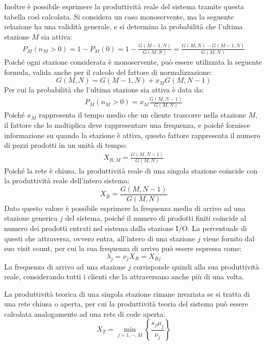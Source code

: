 \documentclass{article}
\numberwithin{equation}{subsection}
\begin{document}
Inoltre è possibile esprimere la produttività reale del sistema tramite questa tabella così calcolata. Si considera un caso monoservente, ma la seguente relazione ha una 
validità generale, e si determina la probabilità che l'ultima stazione $M$ sia attiva:
\begin{gather*}
    P_M(n_M>0)=1-P_M(0)=1-\displaystyle\frac{G(M-1,N)}{G(M,N)}=\frac{G(M,N)-G(M-1,N)}{G(M,N)}
\end{gather*}
Poiché ogni stazione considerata è monoservente, può essere utilizzata la seguente formula, valida anche per il calcolo 
del fattore di normalizzazione:
\begin{equation}
    G(M,N)=G(M-1,N)+x_MG(M,N-1)
\end{equation}
Per cui la probabilità che l'ultima stazione sia attiva è data da:
\begin{gather*}
    P_M(n_M>0)=\displaystyle x_M\frac{G(M,N-1)}{G(M,N)}
\end{gather*}
Poiché $x_M$ rappresenta il tempo medio che un cliente trascorre nella stazione $M$, il fattore che lo moltiplica deve rappresentare una frequenza, e poiché fornisce 
informazione su quando la stazione è attiva, questo fattore rappresenta il numero di pezzi prodotti in un unità di tempo:
\begin{gather*}
    X_{R,M}=\displaystyle\frac{G(M,N-1)}{G(M,N)}
\end{gather*}
Poiché la rete è chiusa, la produttività reale di una singola stazione coincide con la produttività reale dell'intero sistema:
\begin{equation}
    X_R=\displaystyle\frac{G(M,N-1)}{G(M,N)}
\end{equation}
Dato questo valore è possibile esprimere la frequenza media di arrivo ad una stazione generica $j$ del sistema, poiché il numero di prodotti finiti coincide al numero 
dei prodotti entrati nel sistema dalla stazione I/O. La percentuale di questi che attraversa, ovvero entra, all'intero di una stazione $j$ viene fornito dal suo visit 
count, per cui la sua frequenza di arrivo può essere espressa come:
\begin{equation}
    \lambda_j=\nu_jX_R=X_{Rj}
\end{equation}
La frequenza di arrivo ad una stazione $j$ corrisponde quindi alla sua produttività reale, considerando tutti i clienti che la attraversano anche più di una volta. 

La produttività teorica di una singola stazione rimane invariata se si tratta di una rete chiusa o aperta, per cui la produttività teoria del sistema può essere calcolata 
analogamente ad una rete di code aperta:
\begin{equation*}
    X_T=\min_{j=1,\cdots,M}\left\{\displaystyle\frac{s_j\mu_j}{\nu_j}\right\}
\end{equation*}
\end{document}
